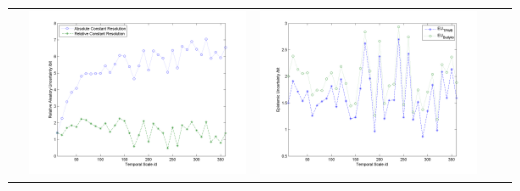 \documentclass[11pt]{article}
\begin{document}
\begin{table}[H]
{\begin{tabular}{c  c   c   c  c }
&\begin{minipage}{.4\textwidth}\includegraphics[width=\linewidth]{resultgraph/05418500AU.png}\end{minipage}
&\begin{minipage}{.4\textwidth}\includegraphics[width=\linewidth]{resultgraph/05418500EU.png}\end{minipage}
\\

\end{tabular}}
\end{table}
\end{document}
